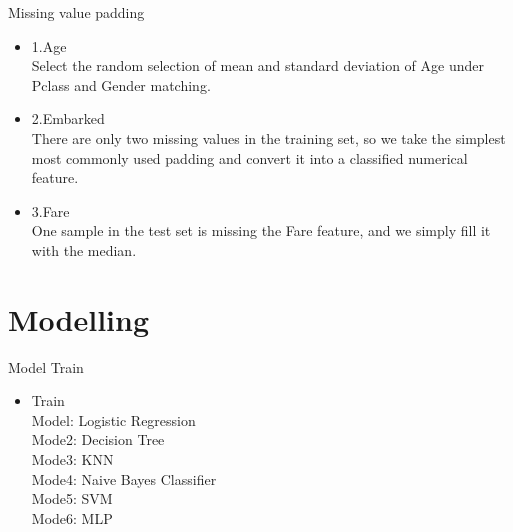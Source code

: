 \documentclass[
size=14pt,
paper=smartboard,  %
mode=present, 		%
display=slides, 	%
style=tuliplab,  	%
pauseslide,
fleqn,leqno]{powerdot}
\begin{document}
	
	
	\begin{slide}{Missing value padding}
		
		\begin{center}
			\begin{itemize}
				
				\item
				\smallskip
				\large
				{1.Age\\
					Select the random selection of mean and standard deviation of Age under Pclass and Gender matching.\\
				}
				\item
				\smallskip
				\large
				{2.Embarked\\
					There are only two missing values in the training set, so we take the simplest most commonly used padding and convert it into a classified numerical feature.\\
				}
				\item
				\smallskip
				\large
				{3.Fare\\
					One sample in the test set is missing the Fare feature, and we simply fill it with the median.\\
				}
				
			\end{itemize}
		\end{center}
		
	\end{slide}
	
	
	
	\section{Modelling}
	\begin{slide}{Model Train}
		
		\begin{center}
			\begin{itemize}
				
				\item
				\smallskip
				\large
				{Train\\
					Model: Logistic Regression\\
					
					Mode2: Decision Tree\\
					
					Mode3: KNN\\
					
					Mode4: Naive  Bayes  Classifier\\
					
					Mode5: SVM \\
					
					Mode6: MLP\\
				}
				
			\end{itemize}
		\end{center}
	\end{slide}
	
\end{document}
